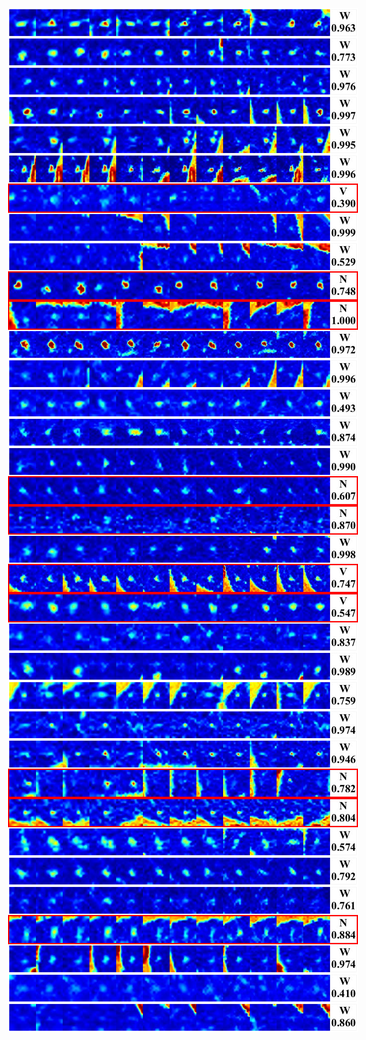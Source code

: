 \documentclass[onecolumn]{IEEEtran}
\begin{document}
\begin{figure}[H]
{\includegraphics[width=0.45\columnwidth]{./images/elcap-mscolornodules-iso1}
}
\end{figure}
\end{document}
